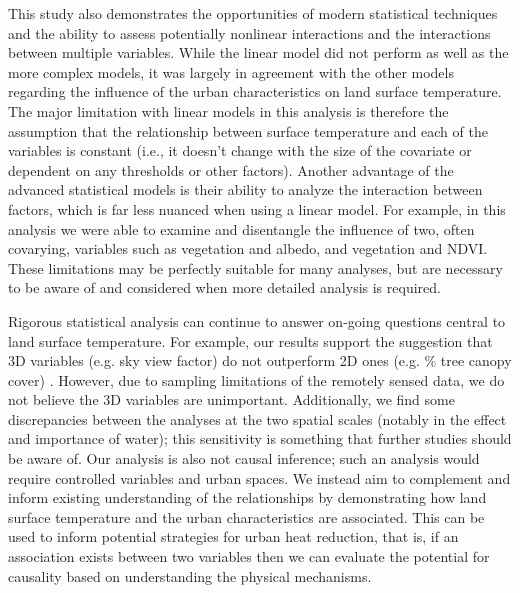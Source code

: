 \documentclass[final,3p,times,onecolumn,sort&compress]{elsarticle}
\begin{document}
This study also demonstrates the opportunities of modern statistical techniques and the ability to assess potentially nonlinear interactions and the interactions between multiple variables. 
While the linear model did not perform as well as the more complex models, it was largely in agreement with the other models regarding the influence of the urban characteristics on land surface temperature.
The major limitation with linear models in this analysis is therefore the assumption that the relationship between surface temperature and each of the variables is constant (i.e., it doesn't change with the size of the covariate or dependent on any thresholds or other factors).
Another advantage of the advanced statistical models is their ability to analyze the interaction between factors, which is far less nuanced when using a linear model.
For example, in this analysis we were able to examine and disentangle the influence of two, often covarying, variables such as vegetation and albedo, and vegetation and NDVI.
These limitations may be perfectly suitable for many analyses, but are necessary to be aware of and considered when more detailed analysis is required.

Rigorous statistical analysis can continue to answer on-going questions central to land surface temperature.
For example, our results support the suggestion that 3D variables (e.g. sky view factor) do not outperform 2D ones (e.g. \% tree canopy cover) \citep{Berger2017-lx}. 
However, due to sampling limitations of the remotely sensed data, we do not believe the 3D variables are unimportant.
Additionally, we find some discrepancies between the analyses at the two spatial scales (notably in the effect and importance of water); this sensitivity is something that further studies should be aware of.
Our analysis is also not causal inference; such an analysis would require controlled variables and urban spaces.
We instead aim to complement and inform existing understanding of the relationships by demonstrating how land surface temperature and the urban characteristics are associated.
This can be used to inform potential strategies for urban heat reduction, that is, if an association exists between two variables then we can evaluate the potential for causality based on understanding the physical mechanisms.
\end{document}
